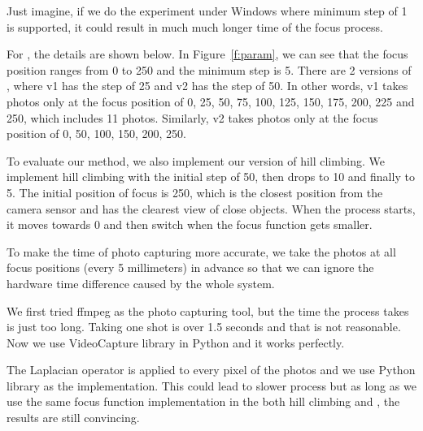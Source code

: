 Just imagine, if we do the experiment under Windows where minimum step of 1 is supported, it could result in much much longer time of the focus process.

For \sysname, the details are shown below.
In Figure~\ref{f:param}, we can see that the focus position ranges from 0 to 250 and the minimum step is 5.
There are 2 versions of \sysname, where v1 has the step of 25 and v2 has the step of 50.
In other words, v1 takes photos only at the focus position of 0, 25, 50, 75, 100, 125, 150, 175, 200, 225 and 250, which includes 11 photos.
Similarly, v2 takes photos only at the focus position of 0, 50, 100, 150, 200, 250.

To evaluate our method, we also implement our version of hill climbing.
We implement hill climbing with the initial step of 50, then drops to 10 and finally to 5.
The initial position of focus is 250, which is the closest position from the camera sensor and has the clearest view of close objects.
When the process starts, it moves towards 0 and then switch when the focus function gets smaller.

To make the time of photo capturing more accurate, we take the photos at all focus positions (every 5 millimeters) in advance so that we can ignore the hardware time difference caused by the whole system.

We first tried ffmpeg as the photo capturing tool, but the time the process takes is just too long.
Taking one shot is over 1.5 seconds and that is not reasonable.
Now we use VideoCapture library in Python and it works perfectly.

The Laplacian operator is applied to every pixel of the photos and we use Python library as the implementation.
This could lead to slower process but as long as we use the same focus function implementation in the both hill climbing and \sysname, the results are still convincing.
